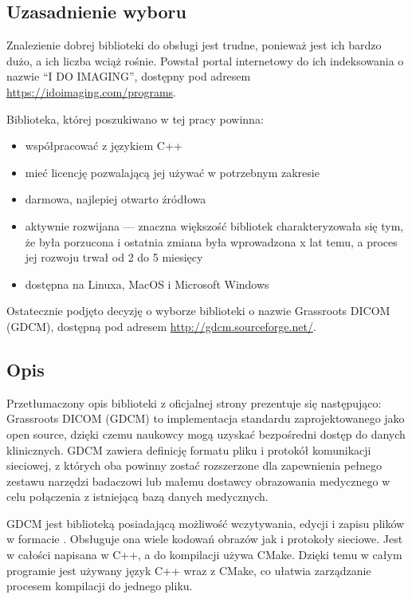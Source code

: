 

\subsection{Uzasadnienie wyboru}

\par
Znalezienie dobrej biblioteki do obsługi jest trudne, ponieważ jest ich bardzo dużo, a ich liczba wciąż rośnie.
Powstał portal internetowy do ich indeksowania o nazwie \enquote{I DO IMAGING}, dostępny pod adresem \url{https://idoimaging.com/programs}.
\par
Biblioteka, której poszukiwano w tej pracy powinna:
\begin{itemize}
    \item współpracować z językiem C++
    \item mieć licencję pozwalającą jej używać w potrzebnym zakresie
    \item darmowa, najlepiej otwarto źródłowa
    \item aktywnie rozwijana --- znaczna większość bibliotek charakteryzowała się tym, że była porzucona i ostatnia zmiana była wprowadzona x lat temu, a proces jej rozwoju trwał od 2 do 5 miesięcy
    \item dostępna na Linuxa, MacOS i Microsoft Windows
\end{itemize}
Ostatecznie podjęto decyzję o wyborze biblioteki o nazwie Grassroots DICOM (GDCM), dostępną pod adresem \url{http://gdcm.sourceforge.net/}.

\subsection{Opis}

\par
Przetłumaczony opis biblioteki z oficjalnej strony prezentuje się następująco:
Grassroots DICOM (GDCM) to implementacja standardu \DICOM zaprojektowanego jako open source, dzięki czemu naukowcy mogą uzyskać bezpośredni dostęp do danych klinicznych.
GDCM zawiera definicję formatu pliku i protokół komunikacji sieciowej, z których oba powinny zostać rozszerzone dla zapewnienia pełnego zestawu narzędzi badaczowi lub małemu dostawcy obrazowania medycznego w celu połączenia z istniejącą bazą danych medycznych.

\par
GDCM jest biblioteką posiadającą możliwość wczytywania, edycji i zapisu plików w formacie \DICOM.
Obsługuje ona wiele kodowań obrazów jak i protokoły sieciowe.
Jest w całości napisana w C++, a do kompilacji używa CMake.
Dzięki temu w całym programie jest używany język C++ wraz z CMake, co ułatwia zarządzanie procesem kompilacji do jednego pliku.

